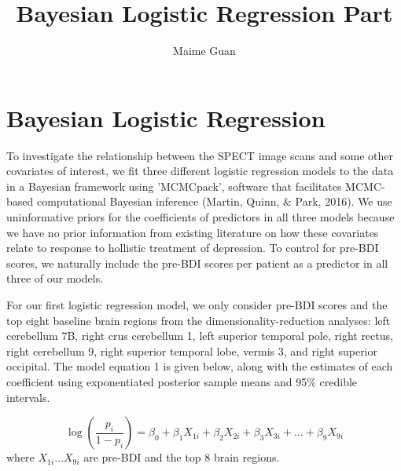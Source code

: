 \documentclass[12pt,doc]{apa}
\title{Bayesian Logistic Regression Part}
\author{Maime Guan}
\affiliation{Department of Cognitive Sciences\\University of California, Irvine}
\begin{document}
\setcounter{page}{0}
\pagestyle{plain}

\maketitle

\section{Bayesian Logistic Regression}

To investigate the relationship between the SPECT image scans and some other covariates of interest, we fit three different logistic regression models to the data in a Bayesian framework using 'MCMCpack', software that facilitates MCMC-based computational Bayesian inference (Martin, Quinn, \& Park, 2016). We use uninformative priors for the coefficients of predictors in all three models because we have no prior information from existing literature on how these covariates relate to response to hollistic treatment of depression. To control for pre-BDI scores, we naturally include the pre-BDI scores per patient as a predictor in all three of our models.

For our first logistic regression model, we only consider pre-BDI scores and the top eight baseline brain regions from the dimensionality-reduction analyses: left cerebellum 7B, right crus cerebellum 1, left superior temporal pole, right rectus, right cerebellum 9, right superior temporal lobe, vermis 3, and right superior occipital. The model equation 1 is given below, along with the estimates of each coefficient using exponentiated posterior sample means and 95\% credible intervals.

\begin{equation}
\log \left( \frac{p_{i}}{1-p_{i}} \right) = \beta_{0} + \beta_{1}X_{1i} + \beta_{2}X_{2i} + \beta_{3}X_{3i} + \ldots + \beta_{9}X_{9i}
\end{equation}
where $X_{1i} \ldots X_{9i}$ are pre-BDI and the top 8 brain regions.
\medskip
\end{document}

